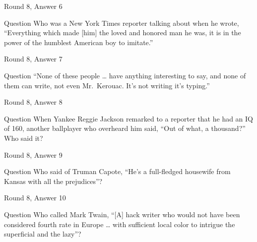 \documentclass[11pt]{beamer}
\begin{document}
\begin{frame}[t]{Round 8, Answer 6}
\begin{block}{Question}
Who was a New York Times reporter talking about when he wrote, ``Everything which made [him] the loved and honored man he was, it is in the power of the humblest American boy to imitate.''
\end{block}
\end{frame}
\begin{frame}[t]{Round 8, Answer 7}
\begin{block}{Question}
``None of these people \ldots{} have anything interesting to say, and none of them can write, not even Mr.\ Kerouac. It's not writing it's typing.''
\end{block}
\end{frame}
\begin{frame}[t]{Round 8, Answer 8}
\begin{block}{Question}
When Yankee Reggie Jackson remarked to a reporter that he had an IQ of 160, another ballplayer who overheard him said, ``Out of what, a thousand?'' Who said it?
\end{block}
\end{frame}
\begin{frame}[t]{Round 8, Answer 9}
\begin{block}{Question}
Who said of Truman Capote, ``He's a full-fledged housewife from Kansas with all the prejudices''?
\end{block}
\end{frame}
\begin{frame}[t]{Round 8, Answer 10}
\begin{block}{Question}
Who called Mark Twain, ``[A] hack writer who would not have been considered fourth rate in Europe \ldots{} with sufficient local color to intrigue the superficial and the lazy''?
\end{block}
\end{frame}
\def\thisSectionName{More Plants and Animals}
\end{document}

